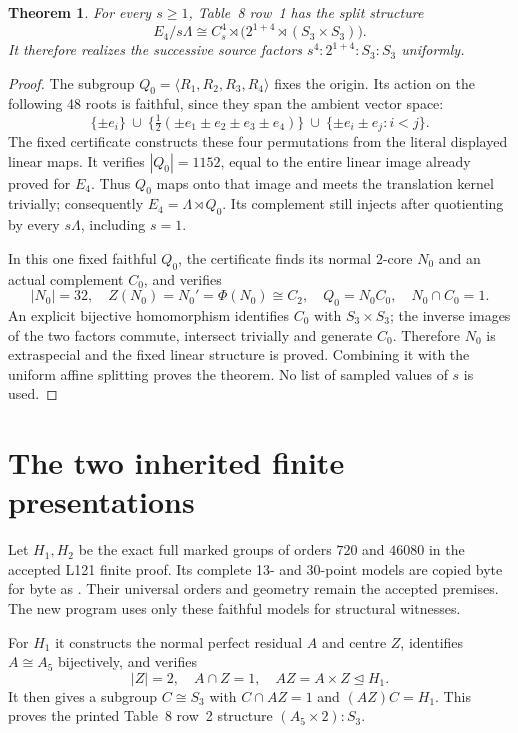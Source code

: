 \documentclass[11pt]{article}
\newtheorem{theorem}{Theorem}\newtheorem{lemma}[theorem]{Lemma}
\newcommand{\C}{C}\newcommand{\Z}{\mathbb Z}
\begin{document}
\begin{theorem}\label{thm:square}
For every $s\ge1$, Table~8 row~1 has the split structure
\[
 E_4/s\Lambda\cong\C_s^4\rtimes
 \bigl(2^{1+4}\rtimes(S_3\times S_3)\bigr).
\]
It therefore realizes the successive source factors
$s^4:2^{1+4}:S_3:S_3$ uniformly.
\end{theorem}
\begin{proof}
The subgroup $Q_0=\langle R_1,R_2,R_3,R_4\rangle$ fixes the origin.
Its action on the following 48 roots is faithful, since they span the
ambient vector space:
\[
 \{\pm e_i\}\ \cup\ \{\tfrac12(\pm e_1\pm e_2\pm e_3\pm e_4)\}
 \ \cup\ \{\pm e_i\pm e_j:i<j\}.
\]
The fixed certificate constructs these four permutations from the
literal displayed linear maps. It verifies $|Q_0|=1152$, equal to the
entire linear image already proved for $E_4$. Thus $Q_0$ maps onto that
image and meets the translation kernel trivially; consequently
$E_4=\Lambda\rtimes Q_0$. Its complement still injects after quotienting
by every $s\Lambda$, including $s=1$.

In this one fixed faithful $Q_0$, the certificate finds its normal
$2$-core $N_0$ and an actual complement $C_0$, and verifies
\[
 |N_0|=32,\quad Z(N_0)=N_0'=\Phi(N_0)\cong\C_2,
 \quad Q_0=N_0C_0,\quad N_0\cap C_0=1.
\]
An explicit bijective homomorphism identifies $C_0$ with $S_3\times S_3$;
the inverse images of the two factors commute, intersect trivially and
generate $C_0$. Therefore $N_0$ is extraspecial and the fixed linear
structure is proved. Combining it with the uniform affine splitting
proves the theorem. No list of sampled values of $s$ is used.
\end{proof}

\section{The two inherited finite presentations}
Let $H_1,H_2$ be the exact full marked groups of orders $720$ and $46080$
in the accepted L121 finite proof. Its complete 13- and 30-point models
are copied byte for byte as . Their
universal orders and geometry remain the accepted premises. The new
program uses only these faithful models for structural witnesses.

For $H_1$ it constructs the normal perfect residual $A$ and centre $Z$,
identifies $A\cong A_5$ bijectively, and verifies
\[
 |Z|=2,\quad A\cap Z=1,\quad AZ=A\times Z\trianglelefteq H_1.
\]
It then gives a subgroup $C\cong S_3$ with
$C\cap AZ=1$ and $(AZ)C=H_1$. This proves the printed Table~8 row~2
structure $(A_5\times2):S_3$.
\end{document}

